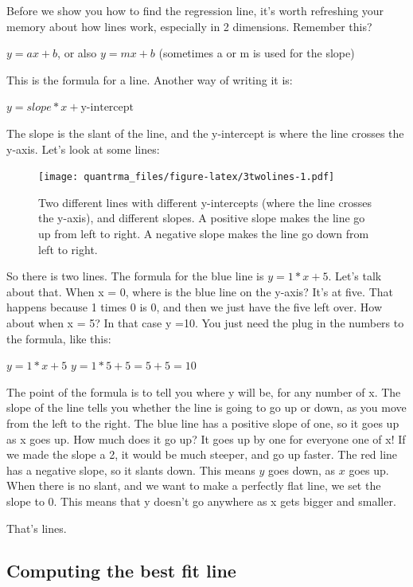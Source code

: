\documentclass[
]{book}
\begin{document}
Before we show you how to find the regression line, it's worth refreshing your memory about how lines work, especially in 2 dimensions. Remember this?

\(y = ax + b\), or also \(y = mx + b\) (sometimes a or m is used for the slope)

This is the formula for a line. Another way of writing it is:

\(y = slope * x + \text{y-intercept}\)

The slope is the slant of the line, and the y-intercept is where the line crosses the y-axis. Let's look at some lines:

\begin{figure}
\centering
\texttt{[image: quantrma\_files/figure-latex/3twolines-1.pdf]}
\caption{\label{fig:3twolines}Two different lines with different y-intercepts (where the line crosses the y-axis), and different slopes. A positive slope makes the line go up from left to right. A negative slope makes the line go down from left to right.}
\end{figure}

So there is two lines. The formula for the blue line is \(y = 1*x + 5\). Let's talk about that. When x = 0, where is the blue line on the y-axis? It's at five. That happens because 1 times 0 is 0, and then we just have the five left over. How about when x = 5? In that case y =10. You just need the plug in the numbers to the formula, like this:

\(y = 1*x + 5\)
\(y = 1*5 + 5 = 5+5 =10\)

The point of the formula is to tell you where y will be, for any number of x. The slope of the line tells you whether the line is going to go up or down, as you move from the left to the right. The blue line has a positive slope of one, so it goes up as x goes up. How much does it go up? It goes up by one for everyone one of x! If we made the slope a 2, it would be much steeper, and go up faster. The red line has a negative slope, so it slants down. This means \(y\) goes down, as \(x\) goes up. When there is no slant, and we want to make a perfectly flat line, we set the slope to 0. This means that y doesn't go anywhere as x gets bigger and smaller.

That's lines.

\hypertarget{computing-the-best-fit-line}{%
\subsection{Computing the best fit line}\label{computing-the-best-fit-line}}
\end{document}
